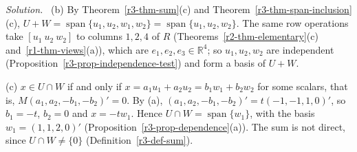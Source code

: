 \documentclass[12pt]{article}
\newcommand{\R}{\mathbb R}
\DeclareMathOperator{\Span}{span}
\theoremstyle{definition}
\newenvironment{solution}{\par\noindent\textit{Solution.}\ }{\par\smallskip}
\begin{document}
\begin{solution}
(b) By Theorem~\ref{r3-thm-sum}(c) and Theorem~\ref{r3-thm-span-inclusion}(c),
\(U+W=\Span\{u_1,u_2,w_1,w_2\}=\Span\{u_1,u_2,w_2\}\). The same row operations take
\([u_1\ u_2\ w_2]\) to columns \(1,2,4\) of \(R\) (Theorems~\ref{r2-thm-elementary}(c)
and~\ref{r1-thm-views}(a)), which are \(e_1,e_2,e_3\in\R^4\); so \(u_1,u_2,w_2\) are independent
(Proposition~\ref{r3-prop-independence-test}) and form a basis of \(U+W\).

(c) \(x\in U\cap W\) if and only if \(x=a_1u_1+a_2u_2=b_1w_1+b_2w_2\) for some scalars, that is,
\(M(a_1,a_2,-b_1,-b_2)'=0\). By (a), \((a_1,a_2,-b_1,-b_2)'=t(-1,-1,1,0)'\), so \(b_1=-t\), \(b_2=0\) and
\(x=-tw_1\). Hence \(U\cap W=\Span\{w_1\}\), with the basis \(w_1=(1,1,2,0)'\)
(Proposition~\ref{r3-prop-dependence}(a)). The sum is not direct, since \(U\cap W\ne\{0\}\)
(Definition~\ref{r3-def-sum}).
\end{solution}
\end{document}

